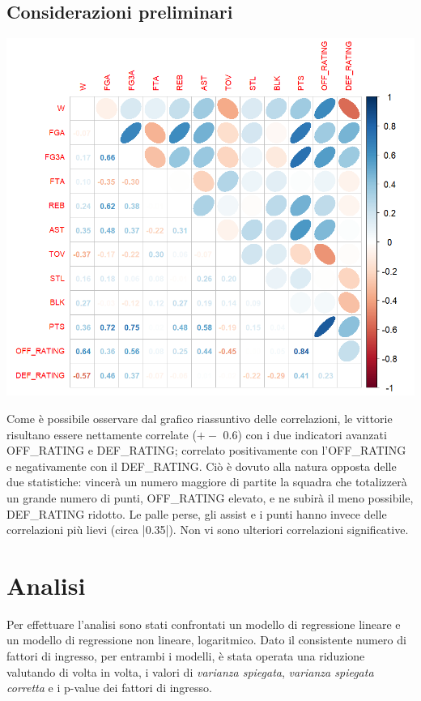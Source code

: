 \documentclass[11pt,a4paper]{article}
\begin{document}
\subsection{Considerazioni preliminari}
\begin{minipage}{0.5\textwidth} 
    \hspace{-1.30cm}
    \includegraphics[scale=.5]{imgs/correlation_plot.png}
\end{minipage}
\begin{minipage}{0.5\textwidth} 
    Come è possibile osservare dal grafico riassuntivo delle correlazioni, le vittorie risultano essere nettamente correlate ($+-$ 0.6) con i due indicatori avanzati OFF\_RATING e DEF\_RATING; correlato positivamente con l'OFF\_RATING e negativamente con il DEF\_RATING. Ciò è dovuto alla natura opposta delle due statistiche: vincerà un numero maggiore di partite la squadra che totalizzerà un grande numero di punti, OFF\_RATING elevato, e ne subirà il meno possibile, DEF\_RATING ridotto.
    Le palle perse, gli assist e i punti hanno invece delle correlazioni più lievi (circa |0.35|). Non vi sono ulteriori correlazioni significative.
\end{minipage}

\section{Analisi}
Per effettuare l'analisi sono stati confrontati un modello di regressione lineare e un modello di regressione non lineare, logaritmico. Dato il consistente numero di fattori di ingresso, per entrambi i modelli, è stata operata una riduzione valutando di volta in volta, i valori di \emph{varianza spiegata}, \emph{varianza spiegata corretta} e i p-value dei fattori di ingresso. 
\end{document}
